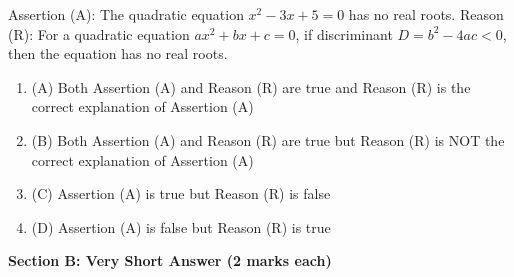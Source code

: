 \documentclass[12pt,a4paper]{exam}
\begin{document}
\begin{questions}
\question[1] Assertion (A): The quadratic equation $x^2 - 3x + 5 = 0$ has no real roots.
Reason (R): For a quadratic equation $ax^2+bx+c=0$, if discriminant $D = b^2 - 4ac < 0$, then the equation has no real roots.
\begin{enumerate}[label=(\Alph*)]
  \item (A) Both Assertion (A) and Reason (R) are true and Reason (R) is the correct explanation of Assertion (A)
  \item (B) Both Assertion (A) and Reason (R) are true but Reason (R) is NOT the correct explanation of Assertion (A)
  \item (C) Assertion (A) is true but Reason (R) is false
  \item (D) Assertion (A) is false but Reason (R) is true
\end{enumerate}
\vspace{0.15cm}

\end{questions}
\bigskip
\noindent\textbf{\large Section B: Very Short Answer (2 marks each)}
\end{document}

